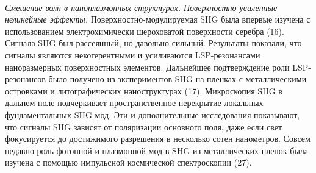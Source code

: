 \\
\hspace*{2mm}
\textit{Смешение волн в наноплазмонных структурах. Поверхностно-усиленные нелинейные эффекты.} Поверхностно-модулируемая SHG была впервые изучена с использованием электрохимически шероховатой поверхности серебра (16). Сигнала SHG был рассеянный, но давольно сильный. Результаты показали, что сигналы являются некогерентными и усиливаются LSP-резонансами наноразмерных поверхностных элементов. Дальнейшее подтверждение роли LSP-резонансов было получено из экспериментов SHG на пленках с металлическими островками и литографических наноструктурах (17). Микроскопия SHG в дальнем поле подчеркивает пространственное перекрытие локальных фундаментальных SHG-мод. Эти и дополнительные исследования показывают, что сигналы SHG зависят от поляризации основного поля, даже если свет фокусируется до достижимого разрешения в несколько сотен нанометров.  Совсем недавно роль фотонной и плазмонной мод в SHG из металлических пленок была изучена с помощью импульсной космической спектроскопии (27).

